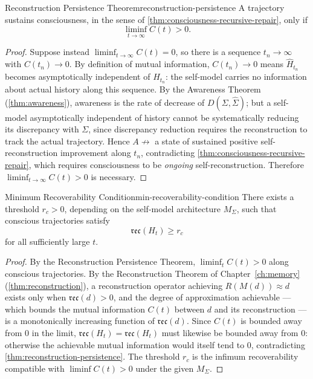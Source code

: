 \documentclass[12pt,twoside,openright]{book}
\newcommand{\reco}{\mathfrak{rec}}
\begin{document}
\begin{theorem}{Reconstruction Persistence Theorem}{reconstruction-persistence}
  A trajectory sustains consciousness, in the sense of
  \cref{thm:consciousness-recursive-repair}, only if
  \[
    \liminf_{t\to\infty} C(t) > 0.
  \]
\end{theorem}

\begin{proof}
  Suppose instead $\liminf_{t\to\infty} C(t) = 0$, so there
  is a sequence $t_n\to\infty$ with $C(t_n)\to0$. By
  definition of mutual information, $C(t_n)\to0$ means
  $\hat{H}_{t_n}$ becomes asymptotically independent of
  $H_{t_n}$: the self-model carries no information about
  actual history along this sequence. By the Awareness
  Theorem (\cref{thm:awareness}), awareness is the rate of
  decrease of $D(\Sigma,\hat\Sigma)$; but a self-model
  asymptotically independent of history cannot be
  systematically reducing its discrepancy with $\Sigma$,
  since discrepancy reduction requires the reconstruction to
  track the actual trajectory. Hence
  $A \not\to$ a state of sustained positive
  self-reconstruction improvement along $t_n$, contradicting
  \cref{thm:consciousness-recursive-repair}, which requires
  consciousness to be \emph{ongoing} self-reconstruction.
  Therefore $\liminf_{t\to\infty} C(t) > 0$ is necessary.
\end{proof}

\begin{theorem}{Minimum Recoverability Condition}{min-recoverability-condition}
  There exists a threshold $r_c > 0$, depending on the
  self-model architecture $M_\Sigma$, such that conscious
  trajectories satisfy
  \[
    \mathfrak{rec}(H_t) \ge r_c
  \]
  for all sufficiently large $t$.
\end{theorem}

\begin{proof}
  By the Reconstruction Persistence Theorem,
  $\liminf_t C(t) > 0$ along conscious trajectories. By the
  Reconstruction Theorem of Chapter~\ref{ch:memory}
  (\cref{thm:reconstruction}), a reconstruction operator
  achieving $R(M(d))\approx d$ exists only when
  $\reco(d) > 0$, and the degree of approximation achievable
  --- which bounds the mutual information $C(t)$ between $d$
  and its reconstruction --- is a monotonically increasing
  function of $\reco(d)$. Since $C(t)$ is bounded away from
  $0$ in the limit, $\reco(H_t) = \mathfrak{rec}(H_t)$ must
  likewise be bounded away from $0$: otherwise the
  achievable mutual information would itself tend to $0$,
  contradicting \cref{thm:reconstruction-persistence}. The
  threshold $r_c$ is the infimum recoverability compatible
  with $\liminf C(t) > 0$ under the given $M_\Sigma$.
\end{proof}
\end{document}
